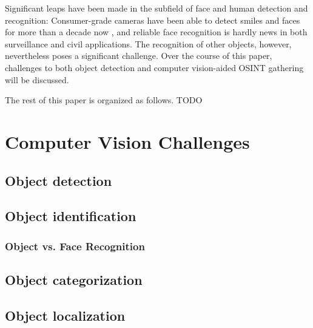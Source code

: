\documentclass[twoside,a4paper]{article}
\begin{document}
Significant leaps have been made in the subfield of face and human detection and recognition: Consumer-grade cameras have been able to detect smiles and faces for more than a decade now , and reliable face recognition is hardly news in both surveillance and civil applications.
The recognition of other objects, however, nevertheless poses a significant challenge. Over the course of this paper, challenges to both object detection and computer vision-aided OSINT gathering will be discussed.

The rest of this paper is organized as follows. TODO

\section{Computer Vision Challenges}
\label{sec:object_det}


\subsection{Object detection}
\label{sec:object_det}


\subsection{Object identification}
\label{sec:object_id}


\subsubsection{Object vs. Face Recognition}
\label{subsec:object_vs_face}

\subsection{Object categorization}
\label{sec:object_cat}


\subsection{Object localization}
\label{sec:object_loc}
\end{document}
